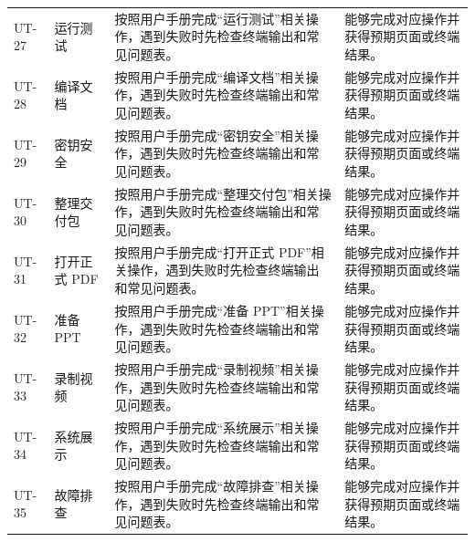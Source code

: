 \documentclass[12pt,a4paper]{ctexart}
\begin{document}
\begin{longtable}{L{1.8cm}L{3.2cm}L{6.4cm}L{4.0cm}}
UT-27 & 运行测试 & 按照用户手册完成“运行测试”相关操作，遇到失败时先检查终端输出和常见问题表。 & 能够完成对应操作并获得预期页面或终端结果。 \\
UT-28 & 编译文档 & 按照用户手册完成“编译文档”相关操作，遇到失败时先检查终端输出和常见问题表。 & 能够完成对应操作并获得预期页面或终端结果。 \\
UT-29 & 密钥安全 & 按照用户手册完成“密钥安全”相关操作，遇到失败时先检查终端输出和常见问题表。 & 能够完成对应操作并获得预期页面或终端结果。 \\
UT-30 & 整理交付包 & 按照用户手册完成“整理交付包”相关操作，遇到失败时先检查终端输出和常见问题表。 & 能够完成对应操作并获得预期页面或终端结果。 \\
UT-31 & 打开正式 PDF & 按照用户手册完成“打开正式 PDF”相关操作，遇到失败时先检查终端输出和常见问题表。 & 能够完成对应操作并获得预期页面或终端结果。 \\
UT-32 & 准备 PPT & 按照用户手册完成“准备 PPT”相关操作，遇到失败时先检查终端输出和常见问题表。 & 能够完成对应操作并获得预期页面或终端结果。 \\
UT-33 & 录制视频 & 按照用户手册完成“录制视频”相关操作，遇到失败时先检查终端输出和常见问题表。 & 能够完成对应操作并获得预期页面或终端结果。 \\
UT-34 & 系统展示 & 按照用户手册完成“系统展示”相关操作，遇到失败时先检查终端输出和常见问题表。 & 能够完成对应操作并获得预期页面或终端结果。 \\
UT-35 & 故障排查 & 按照用户手册完成“故障排查”相关操作，遇到失败时先检查终端输出和常见问题表。 & 能够完成对应操作并获得预期页面或终端结果。 \\
\bottomrule
\end{longtable}
\end{document}
